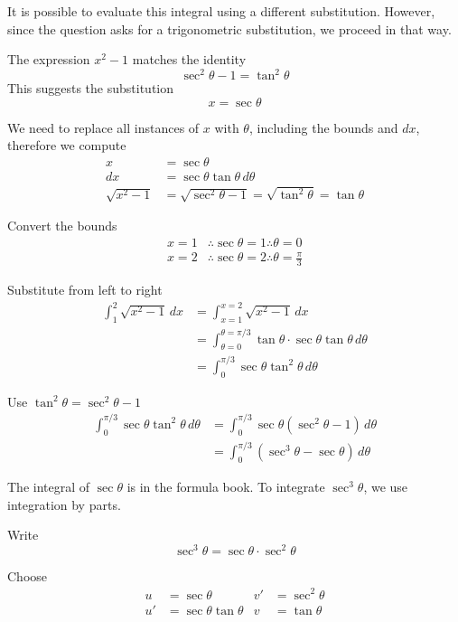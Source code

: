 \begin{solution}
    It is possible to evaluate this integral using a different substitution.
    However, since the question asks for a trigonometric substitution, we proceed in that way.

    The expression $x^2-1$ matches the identity
    \[
        \sec^2\theta-1=\tan^2\theta
    \]
    This suggests the substitution
    \[
        x=\sec\theta
    \]

    We need to replace all instances of $x$ with $\theta$, including the bounds and $dx$, therefore we compute
    \begin{align*}
        x &= \sec\theta\\
        dx &= \sec\theta\tan\theta\,d\theta\\
        \sqrt{x^2-1} &= \sqrt{\sec^2\theta-1}=\sqrt{\tan^2\theta}=\tan\theta
    \end{align*}

    Convert the bounds
    \begin{align*}
        x=1 &\therefore \sec\theta=1 \therefore \theta=0\\
        x=2 &\therefore \sec\theta=2 \therefore \theta=\frac{\pi}{3}
    \end{align*}

    Substitute from left to right
    \begin{align*}
        \int_{1}^{2}\sqrt{x^2-1}\,dx
        &= \int_{x=1}^{x=2}\sqrt{x^2-1}\,dx\\
        &= \int_{\theta=0}^{\theta=\pi/3}\tan\theta\cdot\sec\theta\tan\theta\,d\theta\\
        &= \int_{0}^{\pi/3}\sec\theta\tan^2\theta\,d\theta
    \end{align*}

    Use $\tan^2\theta=\sec^2\theta-1$
    \begin{align*}
        \int_{0}^{\pi/3}\sec\theta\tan^2\theta\,d\theta
        &= \int_{0}^{\pi/3}\sec\theta(\sec^2\theta-1)\,d\theta\\
        &= \int_{0}^{\pi/3}(\sec^3\theta-\sec\theta)\,d\theta
    \end{align*}

    The integral of $\sec\theta$ is in the formula book.
    To integrate $\sec^3\theta$, we use integration by parts.

    Write
    \[
        \sec^3\theta=\sec\theta\cdot\sec^2\theta
    \]

    Choose
    \begin{align*}
        u &= \sec\theta & v' &= \sec^2\theta\\
        u' &= \sec\theta\tan\theta & v &= \tan\theta
    \end{align*}


\end{solution}
